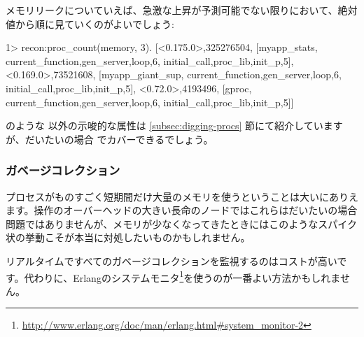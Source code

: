 メモリリークについていえば、急激な上昇が予測可能でない限りにおいて、絶対値から順に見ていくのがよいでしょう:

\begin{VerbatimEshell}
1> recon:proc_count(memory, 3).
[{<0.175.0>,325276504,
  [myapp_stats,
   {current_function,{gen_server,loop,6}},
   {initial_call,{proc_lib,init_p,5}}]},
 {<0.169.0>,73521608,
  [myapp_giant_sup,
   {current_function,{gen_server,loop,6}},
   {initial_call,{proc_lib,init_p,5}}]},
 {<0.72.0>,4193496,
  [gproc,
   {current_function,{gen_server,loop,6}},
   {initial_call,{proc_lib,init_p,5}}]}]
\end{VerbatimEshell}

 のような  以外の示唆的な属性は \ref{subsec:digging-procs} 節にて紹介していますが、だいたいの場合  でカバーできるでしょう。

\subsubsection{ガベージコレクション}
\label{subsubsec:leak-gc}

プロセスがものすごく短期間だけ大量のメモリを使うということは大いにありえます。操作のオーバーヘッドの大きい長命のノードではこれらはだいたいの場合問題ではありませんが、メモリが少なくなってきたときにはこのようなスパイク状の挙動こそが本当に対処したいものかもしれません。

リアルタイムですべてのガベージコレクションを監視するのはコストが高いです。代わりに、Erlangのシステムモニタ\footnote{\href{http://www.erlang.org/doc/man/erlang.html\#system\_monitor-2}{http://www.erlang.org/doc/man/erlang.html\#system\_monitor-2}}を使うのが一番よい方法かもしれません。

